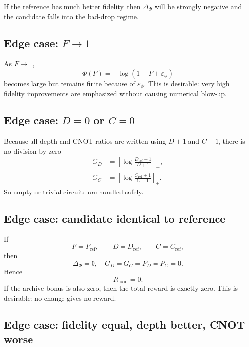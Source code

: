 \documentclass[11pt]{article}
\begin{document}
If the reference has much better fidelity, then $\Delta_{\Phi}$ will be strongly negative and the candidate falls into the bad-drop regime.

\subsection{Edge case: $F\to 1$}

As $F\to 1$,
\begin{equation}
    \Phi(F) = -\log(1-F+\varepsilon_{\phi})
\end{equation}
becomes large but remains finite because of $\varepsilon_{\phi}$.
This is desirable: very high fidelity improvements are emphasized without causing numerical blow-up.

\subsection{Edge case: $D=0$ or $C=0$}

Because all depth and CNOT ratios are written using $D+1$ and $C+1$, there is no division by zero:
\begin{align}
    G_D &= \left[\log\frac{D_{\mathrm{ref}}+1}{D+1}\right]_+, \\
    G_C &= \left[\log\frac{C_{\mathrm{ref}}+1}{C+1}\right]_+.
\end{align}
So empty or trivial circuits are handled safely.

\subsection{Edge case: candidate identical to reference}

If
\begin{equation}
    F=F_{\mathrm{ref}},
    \qquad
    D=D_{\mathrm{ref}},
    \qquad
    C=C_{\mathrm{ref}},
\end{equation}
then
\begin{equation}
    \Delta_{\Phi}=0,
    \quad
    G_D=G_C=P_D=P_C=0.
\end{equation}
Hence
\begin{equation}
    R_{\mathrm{local}}=0.
\end{equation}
If the archive bonus is also zero, then the total reward is exactly zero. This is desirable: no change gives no reward.

\subsection{Edge case: fidelity equal, depth better, CNOT worse}
\end{document}
